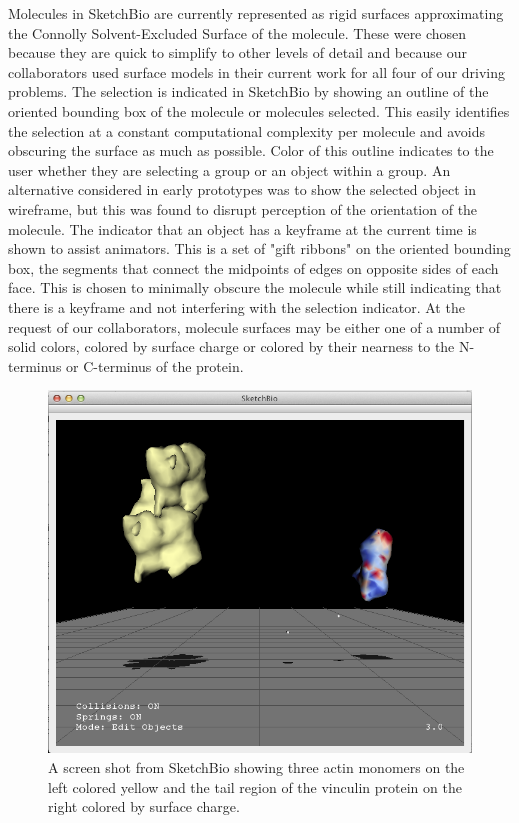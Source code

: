 \documentclass[twocolumn]{bmcart}%
\begin{document}
Molecules in SketchBio are currently represented as rigid surfaces approximating the Connolly Solvent-Excluded Surface of the molecule.
These were chosen because they are quick to simplify to other levels of detail and because our collaborators used surface models in their current work for all four of our driving problems.
The selection is indicated in SketchBio by showing an outline of the oriented bounding box of the molecule or molecules selected. 
This easily identifies the selection at a constant computational complexity per molecule and avoids obscuring the surface as much as possible.
Color of this outline indicates to the user whether they are selecting a group or an object within a group.
An alternative considered in early prototypes was to show the selected object in wireframe, but this was found to disrupt perception of the orientation of the molecule.
The indicator that an object has a keyframe at the current time is shown to assist animators.
This is a set of "gift ribbons" on the oriented bounding box, the segments that connect the midpoints of edges on opposite sides of each face.  %
This is chosen to minimally obscure the molecule while still indicating that there is a keyframe and not interfering with the selection indicator.
At the request of our collaborators, molecule surfaces may be either one of a number of solid colors, colored by surface charge or colored by their nearness to the N-terminus or C-terminus of the protein.

\begin{figure}[ht]
\centering
\includegraphics[width=0.9\columnwidth]{actinVinculin.png}
\caption{A screen shot from SketchBio showing three actin monomers on the left colored yellow and the tail region of the vinculin protein on the right colored by surface charge.}
\label{fig:actin_vinculin}
\end{figure}
\end{document}
